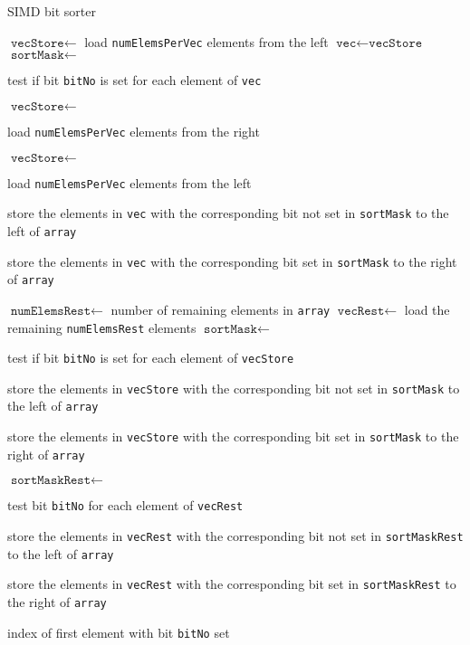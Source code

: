 \documentclass[12pt, a4paper, openright, twoside]{tiarbeit}
\begin{document}
\begin{algorithm}[H]
  \caption{SIMD bit sorter}\label{algo:bit_sort_simd_key_only_main}
  \small
  \begin{algorithmic}[1]
    \State $\texttt{vecStore} \gets$ load \texttt{numElemsPerVec} elements from the left
    \EndIf
    \State $\texttt{vec}\gets \texttt{vecStore}$
    \State $\texttt{sortMask} \gets$ \parbox[t]{.7\linewidth}{test if bit \texttt{bitNo} is set for each element of \texttt{vec}}
    \State $\texttt{vecStore} \gets$ \parbox[t]{.7\linewidth}{load \texttt{numElemsPerVec} elements from the right}
    \Else
    \State $\texttt{vecStore} \gets$ \parbox[t]{.6\linewidth}{load \texttt{numElemsPerVec} elements from the left}
    \EndIf
    \State \parbox[t][2\baselineskip]{.9\linewidth}{store the elements in \texttt{vec} with the corresponding bit not set in \texttt{sortMask} to the left of \texttt{array}}
    \State \parbox[t][2\baselineskip]{.9\linewidth}{store the elements in \texttt{vec} with the corresponding bit set in \texttt{sortMask} to the right of \texttt{array}}
    \EndWhile
    \State $\texttt{numElemsRest}\gets $ number of remaining elements in \texttt{array}
    \State $\texttt{vecRest}\gets$ load the remaining \texttt{numElemsRest} elements
    \EndIf
    \State $\texttt{sortMask} \gets$ \parbox[t]{.7\linewidth}{test if bit \texttt{bitNo} is set for each element of \texttt{vecStore}}
    \State \parbox[t][2\baselineskip]{.9\linewidth}{store the elements in \texttt{vecStore} with the corresponding bit not set in \texttt{sortMask} to the left of \texttt{array}}
    \State \parbox[t][2\baselineskip]{.9\linewidth}{store the elements in \texttt{vecStore} with the corresponding bit set in \texttt{sortMask} to the right of \texttt{array}}
    \EndIf
    \State $\texttt{sortMaskRest} \gets$ \parbox[t]{.7\linewidth}{test bit \texttt{bitNo} for each element of \texttt{vecRest}}
    \State \parbox[t][2\baselineskip]{.9\linewidth}{store the elements in \texttt{vecRest} with the corresponding bit not set in \texttt{sortMaskRest} to the left of \texttt{array}}
    \State \parbox[t][2\baselineskip]{.9\linewidth}{store the elements in \texttt{vecRest} with the corresponding bit set in \texttt{sortMaskRest} to the right of \texttt{array}}
    \EndIf
    \State\Return index of first element with bit \texttt{bitNo} set
    \EndProcedure
  \end{algorithmic}
\end{algorithm}
\end{document}
